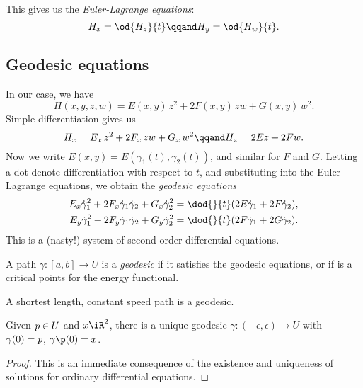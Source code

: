 This gives us the \emph{Euler-Lagrange equations}:
\begin{equation*}
	H_x=\od{H_z}{t} \qqand
	H_y = \od{H_w}{t}.
\end{equation*}


\subsection{Geodesic equations} %
\label{sub:geodesic_equations}

\newcommand{\dgamma}{\dot{\gamma}}

In our case, we have
\begin{equation*}
	H(x,y,z,w) = E(x,y) \, z^2 + 2F(x,y)\,zw + G(x,y)\,w^2.
\end{equation*}
Simple differentiation gives us
\begin{equation*}
	H_x = E_x\,z^2 + 2F_x\,zw + G_x\,w^2 \qqand
	H_z = 2Ez + 2Fw.
\end{equation*}
Now we write $E(x,y) = E(\gamma_1(t), \gamma_2(t))$, and similar for $F$ and $G$. Letting a dot denote differentiation with respect to $t$, and substituting into the Euler-Lagrange equations, we obtain the \emph{geodesic equations}
\begin{align*}
	E_x \dot{\gamma}_1^2 + 2F_x \dgamma_1 \dgamma_2 + G_x \dgamma_2^2 &= \dod{}{t}(2E\dgamma_1 + 2F\dgamma_2), \\
	E_y \dgamma_1^2 + 2 F_y \dgamma_1 \dgamma_2 + G_y \dgamma_2^2 &= \dod{}{t}(2F\dgamma_1 + 2G\dgamma_2).
\end{align*}
This is a (nasty!) system of second-order differential equations.

\begin{definition}
	A path $\gamma:[a,b]\to U$ is a \emph{geodesic} if it satisfies the geodesic equations, or if is a critical points for the energy functional.

	A shortest length, constant speed path is a geodesic.
\end{definition}

\begin{theorem}
	Given $p\in U$ and $\xx\iR^2$, there is a unique geodesic $\gamma:(-\epsilon,\epsilon)\to U$ with $\gamma(0)=p$, $\gamma\p(0)=\xx$.
\end{theorem}

\begin{proof}
	This is an immediate consequence of the existence and uniqueness of solutions for ordinary differential equations.
\end{proof}

